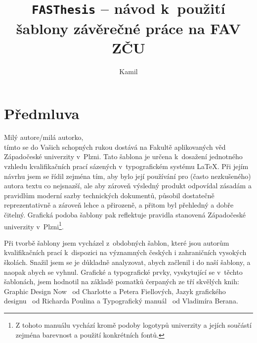 \documentclass[czech, ma, kiv, he, iso690alph, pdf, viewonly]{fasthesis}
\title{\texttt{FASThesis} -- návod k~použití šablony závěrečné práce na FAV ZČU}
\author{Kamil}{Ekštein}{Ing.}{Ph.D.}
\begin{document}
\frontpages[tm] %
\tableofcontents
% 
%
\makeatletter%
\ifx\FASThesis@style\c@fullcolor%
\else%
\fi%
\makeatother%
%
%
%
%
\chapter*[Předmluva]{Předmluva}
Milý autore/milá autorko,\\[\baselineskip]
tímto se do Vašich schopných rukou dostává  na Fakultě aplikovaných věd Západočeské univerzity v~Plzni. Tato šablona je určena k~dosažení jednotného vzhledu kvalifikačních prací sázených v~typografickém systému \LaTeX. Při jejím návrhu jsem se řídil zejména tím, aby bylo její používání pro (často ne\-zku\-še\-né\-ho) autora textu co nejsnazší, ale aby zároveň výsledný produkt odpovídal zásadám a pravidlům moderní sazby technických dokumentů, působil dostatečně reprezentativně a zároveň lehce a přirozeně, a přitom byl přehledný a dobře čitelný. Grafická podoba šablony pak reflektuje pravidla stanovená  Západočeské univerzity v~Plzni\footnote{Z tohoto manuálu vychází kromě podoby logotypů univerzity a jejích součástí zejména barevnost a použití konkrétních fontů.}.

Při tvorbě šablony jsem vycházel z~obdobných šablon, které jsou autorům kvalifikačních prací k~dispozici na významných českých i zahraničních vysokých školách. Snažil jsem se je důkladně analyzovat, abych  začlenil i do naší šablony, a naopak  abych se vyhnul. Grafické a typografické prvky, vyskytující se v~těchto šablonách, jsem hodnotil na základě poznatků čerpaných ze tří skvělých knih: Graphic Design Now~\cite{Fiells2005} od Charlotte a Petera Fiellových, Jazyk grafického designu~\cite{Poulin2012} od Richarda Poulina a Typografický manuál~\cite{Beran2016} od Vladimíra Berana.
\end{document}
